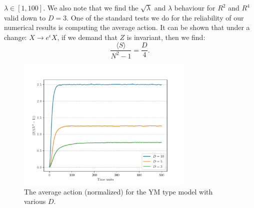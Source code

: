 \documentclass[letter,11pt]{article}
\begin{document}
$\lambda \in [1,100]$. 
We also note that we find the $\sqrt{\lambda}$ and $\lambda$ behaviour for 
$R^2$ and $R^4$ valid down to $D=3$. 
One of the standard tests we do for the reliability of our numerical results is 
computing the average action. It can be shown that under a 
change: $X \to e^{\epsilon} X$, if we demand that $Z$ is invariant, 
then we find:
\begin{equation}
\label{eq:SD_YMD} 
	\frac{\langle S \rangle}{N^2 - 1} = \frac{D}{4}. 
\end{equation}
\begin{figure}[htbp] 
	\centering 
	\includegraphics[width=0.75\textwidth]{figs/act_allD_YM.pdf}
	\caption{\label{fig:YM_allD}The average action (normalized) for the YM type model with various $D$.}
\end{figure}
\end{document}
